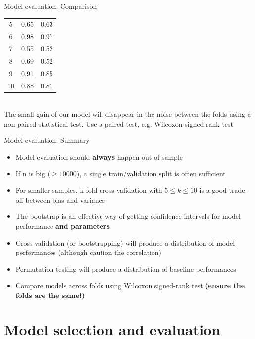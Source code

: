 \documentclass[10pt]{beamer}
\begin{document}
\begin{frame}{Model evaluation: Comparison}
{\begin{center}
\begin{tabular}{|c|c|c|}
                    5 & 0.65 & 0.63 \\
                    6 & 0.98 & 0.97 \\
                    7 & 0.55 & 0.52 \\
                    8 & 0.69 & 0.52 \\
                    9 & 0.91 & 0.85 \\
                    10 & 0.88 & 0.81 \\
                    \hline
                \end{tabular}\\[0.2cm]
                The small gain of our model will disappear in the noise between the folds using a non-paired statistical test. Use a paired test, e.g. Wilcoxon signed-rank test
            \end{center}
        }
    \end{frame}

    \begin{frame}{Model evaluation: Summary}
        \begin{itemize}
            \item Model evaluation should \textbf{always} happen out-of-sample
            \item If n is big ($\geq 10000$), a single train/validation split is often sufficient
            \item For smaller samples, k-fold cross-validation with $5 \leq k \leq 10$ is a good trade-off between bias and variance
            \item The bootstrap is an effective way of getting confidence intervals for model performance \textbf{and parameters}
            \item Cross-validation (or bootstrapping) will produce a distribution of model performances (although caution the correlation)
            \item Permutation testing will produce a distribution of baseline performances
            \item Compare models across folds using Wilcoxon signed-rank test \textbf{(ensure the folds are the same!)}
        \end{itemize}
    \end{frame}

    \section{Model selection and evaluation}
\end{document}
